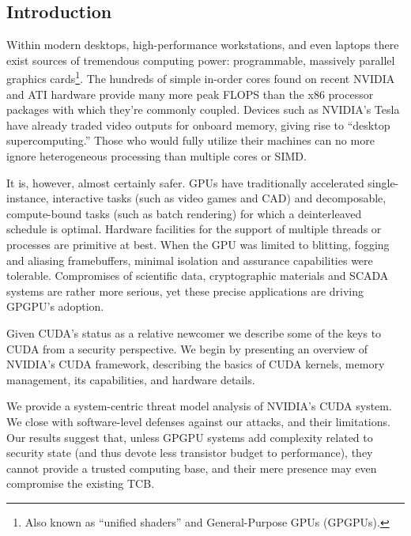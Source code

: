 \documentclass[letterpaper,10pt]{article}
\begin{document}
\begin{multicols}{2}
\section{Introduction}
Within modern desktops, high-performance workstations, and even laptops there
exist sources of tremendous computing power: programmable, massively parallel graphics cards\footnote{Also known as ``unified shaders'' and General-Purpose GPUs (GPGPUs).}.
The hundreds of simple in-order cores found on recent NVIDIA and ATI hardware provide many more peak FLOPS than the x86 processor packages with
which they're commonly coupled.
Devices such as NVIDIA's Tesla\texttrademark{} have already traded video outputs for onboard memory, giving rise to ``desktop
supercomputing.'' Those who would fully utilize their machines can
no more ignore heterogeneous processing than multiple cores or SIMD\@.

It is, however, almost certainly safer. GPUs have traditionally accelerated
single-instance, interactive tasks (such as video games and CAD) and
decomposable, compute-bound tasks (such as batch rendering) for which a
deinterleaved schedule is optimal. Hardware facilities for the support of
multiple threads or processes are primitive at best. When the GPU was limited to
blitting, fogging and aliasing framebuffers, minimal isolation and
assurance capabilities were tolerable. Compromises of scientific data,
cryptographic materials and SCADA systems are rather more serious, yet these
precise applications are driving GPGPU's adoption. 

Given CUDA's status as a relative newcomer we describe some of the keys to CUDA from a security perspective.  We begin by presenting an overview of NVIDIA's CUDA framework, describing the basics of CUDA kernels, memory management, its capabilities, and hardware details.

We provide a system-centric threat model analysis of NVIDIA's CUDA system.
We close with software-level defenses against our attacks, and their limitations.
Our results suggest that, unless GPGPU systems add complexity related to security state (and thus devote
less transistor budget to performance), they cannot provide a trusted computing
base, and their mere presence may even compromise the existing TCB.


\end{multicols}
\end{document}
